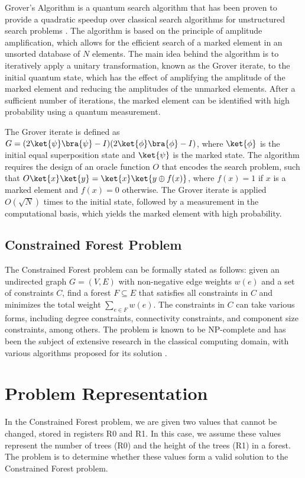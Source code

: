 Grover's Algorithm is a quantum search algorithm that has been proven to provide a quadratic speedup over classical search algorithms for unstructured search problems \cite{grover1996}. The algorithm is based on the principle of amplitude amplification, which allows for the efficient search of a marked element in an unsorted database of $N$ elements. The main idea behind the algorithm is to iteratively apply a unitary transformation, known as the Grover iterate, to the initial quantum state, which has the effect of amplifying the amplitude of the marked element and reducing the amplitudes of the unmarked elements. After a sufficient number of iterations, the marked element can be identified with high probability using a quantum measurement.

The Grover iterate is defined as $G = (2 \ket{\psi}\bra{\psi} - I)(2 \ket{\phi}\bra{\phi} - I)$, where $\ket{\phi}$ is the initial equal superposition state and $\ket{\psi}$ is the marked state. The algorithm requires the design of an oracle function $O$ that encodes the search problem, such that $O\ket{x}\ket{y} = \ket{x}\ket{y \oplus f(x)}$, where $f(x) = 1$ if $x$ is a marked element and $f(x) = 0$ otherwise. The Grover iterate is applied $O(\sqrt{N})$ times to the initial state, followed by a measurement in the computational basis, which yields the marked element with high probability.

\subsection{Constrained Forest Problem}

The Constrained Forest problem can be formally stated as follows: given an undirected graph $G = (V, E)$ with non-negative edge weights $w(e)$ and a set of constraints $C$, find a forest $F \subseteq E$ that satisfies all constraints in $C$ and minimizes the total weight $\sum_{e \in F} w(e)$. The constraints in $C$ can take various forms, including degree constraints, connectivity constraints, and component size constraints, among others. The problem is known to be NP-complete \cite{garey1979} and has been the subject of extensive research in the classical computing domain, with various algorithms proposed for its solution \cite{tarjan1977, frederickson1987}.


\section{Problem Representation}
In the Constrained Forest problem, we are given two values that cannot be changed, stored in registers R0 and R1. In this case, we assume these values represent the number of trees (R0) and the height of the trees (R1) in a forest. The problem is to determine whether these values form a valid solution to the Constrained Forest problem.

